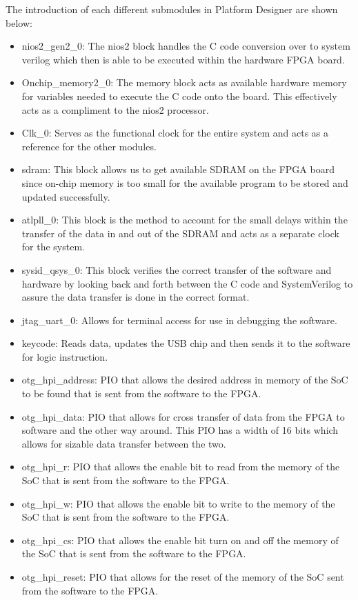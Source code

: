 \documentclass[11pt]{article}
\begin{document}
The introduction of each different submodules in Platform Designer are shown below:
\begin{itemize}
\item nios2\_gen2\_0: The nios2 block handles the C code conversion over to system verilog which then is able to be executed within the hardware FPGA board. 
\item Onchip\_memory2\_0: The memory block acts as available hardware memory for variables needed to execute the C code onto the board. This effectively acts as a compliment to the nios2 processor. 
\item Clk\_0: Serves as the functional clock for the entire system and acts as a reference for the other modules. 
\item sdram: This block allows us to get available SDRAM on the FPGA board since on-chip memory is too small for the available program to be stored and updated successfully. 
\item atlpll\_0: This block is the method to account for the small delays within the transfer of the data in and out of the SDRAM and acts as a separate clock for the system. 
\item sysid\_qsys\_0: This block verifies the correct transfer of the software and hardware by looking back and forth between the C code and SystemVerilog to assure the data transfer is done in the correct format. 
\item jtag\_uart\_0: Allows for terminal access for use in debugging the software. 
\item keycode: Reads data, updates the USB chip and then sends it to the software for logic instruction. 
\item otg\_hpi\_address: PIO that allows the desired address in memory of the SoC to be found that is sent from the software to the FPGA. 
\item otg\_hpi\_data: PIO that allows for cross transfer of data from the FPGA to software and the other way around.  This PIO has a width of 16 bits which allows for sizable data transfer between the two. 
\item otg\_hpi\_r: PIO that allows the enable bit to read from the memory of the SoC that is sent from the software to the FPGA. 
\item otg\_hpi\_w: PIO that allows the enable bit to write to the memory of the SoC that is sent from the software to the FPGA. 
\item otg\_hpi\_cs: PIO that allows the enable bit turn on and off the memory of the SoC that is sent from the software to the FPGA. 
\item otg\_hpi\_reset: PIO that allows for the reset of the memory of the SoC sent from the software to the FPGA.
\end{itemize}
\end{document}
